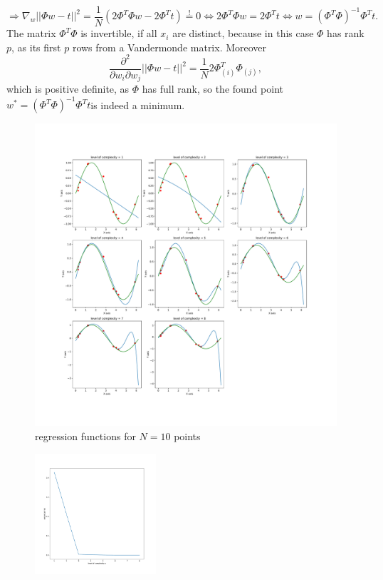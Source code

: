 \documentclass[english]{exercisesheet}
\begin{document}
\begin{solution}
\begin{equation*}
\end{equation*}
\begin{equation*}
 \Rightarrow \nabla_w ||\Phi w-t||^2= \frac{1}{N}\left( 2\Phi^T\Phi w -2\Phi^Tt\right)\stackrel{!}{=}0\Leftrightarrow 2 \Phi^T\Phi w=2\Phi^Tt \Leftrightarrow w=(\Phi^T\Phi)^{-1}\Phi^T t.
\end{equation*}
The matrix $\Phi^T\Phi$ is invertible, if all $x_i$ are distinct, because in this case $\Phi$ has rank $p$, as its first $p$ rows from a Vandermonde matrix. Moreover
\begin{equation*}
 \frac{\partial^2}{\partial w_i \partial w_j} ||\Phi w-t||^2 =\frac{1}{N} 2\Phi_{(i)}^T\Phi_{(j)},
\end{equation*}
which is positive definite, as $\Phi$ has full rank, so the found point $w^*= (\Phi^T\Phi)^{-1}\Phi^T t$is indeed a minimum.\\
\begin{figure}
  \includegraphics[width=\textwidth]{images/samples-10.pdf}
  \caption{regression functions for $N=10$ points}
  \label{samp10}
 \end{figure}
 \begin{figure}
  \includegraphics[width=0.4\textwidth]{images/empirical_risk-10.pdf}

\end{figure}
\end{solution}
\end{document}
